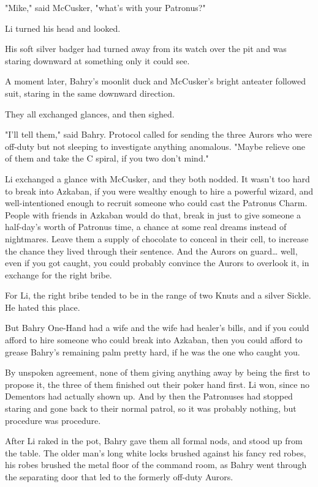 "Mike," said McCusker, "what's with your Patronus?"

Li turned his head and looked.

His soft silver badger had turned away from its watch over the pit and was
staring downward at something only it could see.

A moment later, Bahry's moonlit duck and McCusker's bright anteater followed
suit, staring in the same downward direction.

They all exchanged glances, and then sighed.

"I'll tell them," said Bahry. Protocol called for sending the three Aurors who
were off-duty but not sleeping to investigate anything anomalous. "Maybe
relieve one of them and take the C spiral, if you two don't mind."

Li exchanged a glance with McCusker, and they both nodded. It wasn't too hard
to break into Azkaban, if you were wealthy enough to hire a powerful wizard,
and well-intentioned enough to recruit someone who could cast the Patronus
Charm. People with friends in Azkaban would do that, break in just to give
someone a half-day's worth of Patronus time, a chance at some real dreams
instead of nightmares. Leave them a supply of chocolate to conceal in their
cell, to increase the chance they lived through their sentence. And the Aurors
on guard{\ldots} well, even if you got caught, you could probably convince the
Aurors to overlook it, in exchange for the right bribe.

For Li, the right bribe tended to be in the range of two Knuts and a silver
Sickle. He hated this place.

But Bahry One-Hand had a wife and the wife had healer's bills, and if you could
afford to hire someone who could break into Azkaban, then you could afford to
grease Bahry's remaining palm pretty hard, if he was the one who caught you.

By unspoken agreement, none of them giving anything away by being the first to
propose it, the three of them finished out their poker hand first. Li won,
since no Dementors had actually shown up. And by then the Patronuses had
stopped staring and gone back to their normal patrol, so it was probably
nothing, but procedure was procedure.

After Li raked in the pot, Bahry gave them all formal nods, and stood up from
the table. The older man's long white locks brushed against his fancy red
robes, his robes brushed the metal floor of the command room, as Bahry went
through the separating door that led to the formerly off-duty Aurors.

